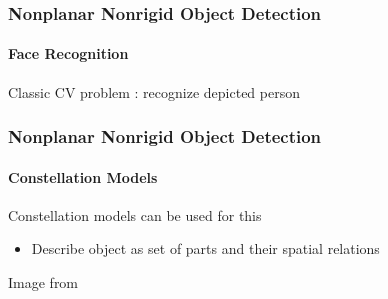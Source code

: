 \documentclass[xetex,professionalfont]{beamer}
\renewcommand\emph[1]{\textcolor{tuwcvl_inf_red}{#1}}
\begin{document}

\begin{frame}
\frametitle{Nonplanar Nonrigid Object Detection}
\framesubtitle{Face Recognition}

Classic CV problem : recognize depicted person

\medskip
\begin{center}
\end{center}

\end{frame}


\begin{frame}
\frametitle{Nonplanar Nonrigid Object Detection}
\framesubtitle{Constellation Models}

\emph{Constellation models} can be used for this
\begin{itemize}
    \item Describe object as set of parts and their spatial relations
\end{itemize}

\medskip
\begin{center}
    {\centering Image from \cite{fischler1973}}
\end{center}

\end{frame}
\end{document}
